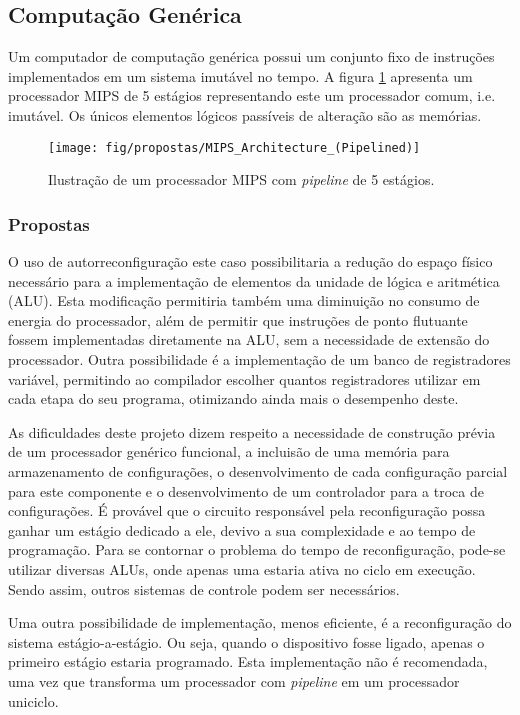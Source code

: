 \documentclass[11pt,a4paper,oneside]{book}
\begin{document}
\subsection{Computação Genérica}
Um computador de computação genérica possui um conjunto fixo de instruções implementados em um sistema imutável no tempo.
A figura \ref{fig:mips} apresenta um processador MIPS de 5 estágios representando este um processador comum, i.e. imutável.
Os únicos elementos lógicos passíveis de alteração são as memórias.

\begin{figure}[h]
\centering
\texttt{[image: fig/propostas/MIPS\_Architecture\_(Pipelined)]}
\caption{Ilustração de um processador MIPS com \textit{pipeline} de 5 estágios.}
\label{fig:mips}
\end{figure}

\subsubsection{Propostas}
O uso de autorreconfiguração este caso possibilitaria a redução do espaço físico necessário para a implementação de elementos da unidade de lógica e aritmética (ALU).
Esta modificação permitiria também uma diminuição no consumo de energia do processador, além de permitir que instruções de ponto flutuante fossem implementadas diretamente na ALU, sem a necessidade de extensão do processador.
Outra possibilidade é a implementação de um banco de registradores variável, permitindo ao compilador escolher quantos registradores utilizar em cada etapa do seu programa, otimizando ainda mais o desempenho deste.

As dificuldades deste projeto dizem respeito a necessidade de construção prévia de um processador genérico funcional, a incluisão de uma memória para armazenamento de configurações, o desenvolvimento de cada configuração parcial para este componente e o desenvolvimento de um controlador para a troca de configurações.
É provável que o circuito responsável pela reconfiguração possa ganhar um estágio dedicado a ele, devivo a sua complexidade e ao tempo de programação.
Para se contornar o problema do tempo de reconfiguração, pode-se utilizar diversas ALUs, onde apenas uma estaria ativa no ciclo em execução.
Sendo assim, outros sistemas de controle podem ser necessários.

Uma outra possibilidade de implementação, menos eficiente, é a reconfiguração do sistema estágio-a-estágio.
Ou seja, quando o dispositivo fosse ligado, apenas o primeiro estágio estaria programado.
Esta implementação não é recomendada, uma vez que transforma um processador com \textit{pipeline} em um processador uniciclo.
\end{document}
